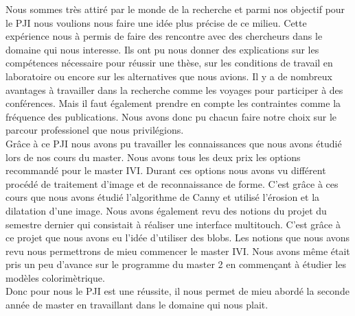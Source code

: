 Nous sommes très attiré par le monde de la recherche et parmi nos objectif pour le PJI nous voulions 
nous faire une idée plus précise de ce milieu. Cette expérience nous à permis de faire des rencontre
avec des chercheurs dans le domaine qui nous interesse. Ils ont pu nous donner des explications
sur les compétences nécessaire pour réussir une thèse, sur les conditions de travail en laboratoire 
ou encore sur les alternatives que nous avions. Il y a de nombreux avantages à travailler dans la recherche
comme les voyages pour participer à des conférences. Mais il faut également prendre en compte les contraintes
comme la fréquence des publications. Nous avons donc pu chacun faire notre choix sur le parcour professionel
que nous privilégions.\\

Grâce à ce PJI nous avons pu travailler les connaissances que nous avons étudié lors de nos cours du master.
Nous avons tous les deux prix les options recommandé pour le master IVI. Durant ces options nous avons 
vu différent procédé de traitement d'image et de reconnaissance de forme. C'est grâce à ces cours que nous
avons étudié l'algorithme de Canny et utilisé l'érosion et la dilatation d'une image. Nous avons également
revu des notions du projet du semestre dernier qui consistait à réaliser une interface multitouch. C'est grâce
à ce projet que nous avons eu l'idée d'utiliser des blobs.
Les notions que nous avons revu nous permettrons de mieu commencer le master IVI. Nous avons même était pris
un peu d'avance sur le programme du master 2 en commençant à étudier les modèles colorimètrique.\\

Donc pour nous le PJI est une réussite, il nous permet de mieu abordé la seconde année de master en travaillant 
dans le domaine qui nous plait.
\newpage